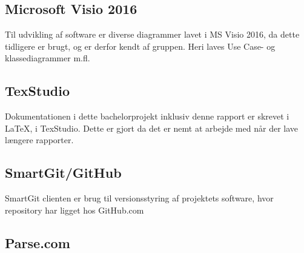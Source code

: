 \subsection*{Microsoft Visio 2016}

Til udvikling af software er diverse diagrammer lavet i MS Visio 2016, da dette tidligere er brugt, og er derfor kendt af gruppen. Heri laves Use Case- og klassediagrammer m.fl.

\subsection*{TexStudio}
Dokumentationen i dette bachelorprojekt inklusiv denne rapport er skrevet i \LaTeX, i TexStudio. Dette er gjort da det er nemt at arbejde med når der lave længere rapporter.

\subsection*{SmartGit/GitHub}
SmartGit clienten er brug til versionsstyring af projektets software, hvor repository har ligget hos GitHub.com

\subsection*{Parse.com}


